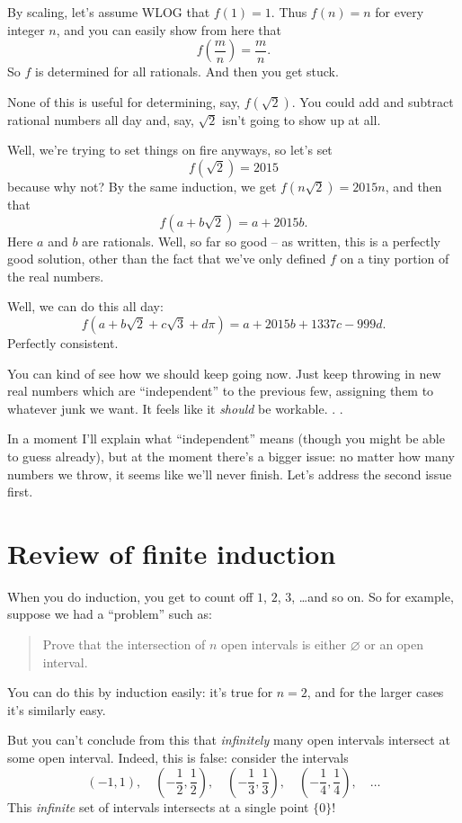 By scaling, let's assume WLOG that $f(1) = 1$.
Thus $f(n) = n$ for every integer $n$, and you can easily show from here that
\[ f\left( \frac mn \right) = \frac mn. \]
So $f$ is determined for all rationals. And then you get stuck.

None of this is useful for determining, say, $f(\sqrt 2)$.
You could add and subtract rational numbers all day
and, say, $\sqrt 2$ isn't going to show up at all.

Well, we're trying to set things on fire anyways, so let's set
\[ f(\sqrt 2) = 2015 \]
because why not?
By the same induction, we get $f(n\sqrt2) = 2015n$, and then that
\[ f\left( a + b \sqrt 2 \right) = a + 2015b. \]
Here $a$ and $b$ are rationals.
Well, so far so good -- as written, this is a perfectly good solution,
other than the fact that we've only defined $f$ on a tiny portion of the real numbers.

Well, we can do this all day:
\[ f\left( a + b \sqrt 2 + c \sqrt 3 + d \pi \right) = a + 2015b + 1337c - 999d. \]
Perfectly consistent.

You can kind of see how we should keep going now.
Just keep throwing in new real numbers which are ``independent''
to the previous few, assigning them to whatever junk we want.
It feels like it \emph{should} be workable. . .

In a moment I'll explain what ``independent'' means (though you
might be able to guess already), but at the moment there's a bigger issue:
no matter how many numbers we throw, it seems like we'll never finish.
Let's address the second issue first.

\section{Review of finite induction}
When you do induction, you get to count off $1$, $2$, $3$, \dots and so on.
So for example, suppose we had a ``problem'' such as:
\begin{quote}
	Prove that the intersection of $n$ open intervals is either $\varnothing$
	or an open interval.
\end{quote}
You can do this by induction easily: it's true for $n = 2$, and
for the larger cases it's similarly easy.

But you can't conclude from this that \emph{infinitely} many open intervals intersect
at some open interval. Indeed, this is false: consider the intervals
\[
	\left( -1, 1 \right), \quad
	\left( -\frac12, \frac12 \right), \quad
	\left( -\frac13, \frac13 \right), \quad
	\left( -\frac14, \frac14 \right), \quad
	\dots
\]
This \emph{infinite} set of intervals intersects at a single point $\{0\}$!

